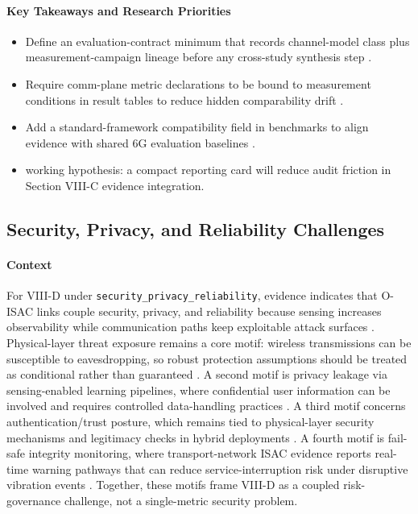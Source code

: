 \paragraph{Key Takeaways and Research Priorities}
\begin{itemize}
    \item Define an evaluation-contract minimum that records channel-model class plus measurement-campaign lineage before any cross-study synthesis step \cite{O_ISAC_327}.
    \item Require comm-plane metric declarations to be bound to measurement conditions in result tables to reduce hidden comparability drift \cite{O_ISAC_381}.
    \item Add a standard-framework compatibility field in benchmarks to align evidence with shared 6G evaluation baselines \cite{O_ISAC_327}.
    \item working hypothesis: a compact reporting card will reduce audit friction in Section VIII-C evidence integration.
\end{itemize}

\subsection{Security, Privacy, and Reliability Challenges}

\paragraph{Context}
For VIII-D under \texttt{security\_privacy\_reliability}, evidence indicates that O-ISAC links couple security, privacy, and reliability because sensing increases observability while communication paths keep exploitable attack surfaces \cite{O_ISAC_145, O_ISAC_039}. Physical-layer threat exposure remains a core motif: wireless transmissions can be susceptible to eavesdropping, so robust protection assumptions should be treated as conditional rather than guaranteed \cite{O_ISAC_145}. A second motif is privacy leakage via sensing-enabled learning pipelines, where confidential user information can be involved and requires controlled data-handling practices \cite{O_ISAC_039}. A third motif concerns authentication/trust posture, which remains tied to physical-layer security mechanisms and legitimacy checks in hybrid deployments \cite{O_ISAC_145}. A fourth motif is fail-safe integrity monitoring, where transport-network ISAC evidence reports real-time warning pathways that can reduce service-interruption risk under disruptive vibration events \cite{O_ISAC_041}. Together, these motifs frame VIII-D as a coupled risk-governance challenge, not a single-metric security problem.

